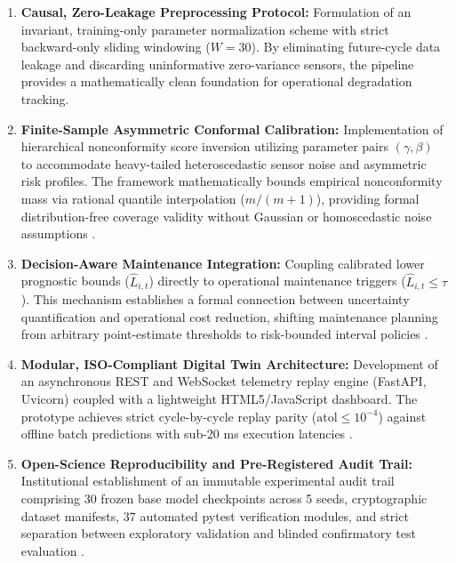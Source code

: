 \documentclass[12pt,a4paper]{article}
\begin{document}
\begin{enumerate}[label=\textbf{(\alph*)},leftmargin=1.5em]
    \item \textbf{Causal, Zero-Leakage Preprocessing Protocol:} Formulation of an invariant, training-only parameter normalization scheme with strict backward-only sliding windowing ($W=30$). By eliminating future-cycle data leakage and discarding uninformative zero-variance sensors, the pipeline provides a mathematically clean foundation for operational degradation tracking.
    \item \textbf{Finite-Sample Asymmetric Conformal Calibration:} Implementation of hierarchical nonconformity score inversion utilizing parameter pairs $(\gamma, \beta)$ to accommodate heavy-tailed heteroscedastic sensor noise and asymmetric risk profiles. The framework mathematically bounds empirical nonconformity mass via rational quantile interpolation ($m/(m+1)$), providing formal distribution-free coverage validity without Gaussian or homoscedastic noise assumptions \cite{javanmardi2023conformal, gneiting2007strictly}.
    \item \textbf{Decision-Aware Maintenance Integration:} Coupling calibrated lower prognostic bounds ($\hat{L}_{i,t}$) directly to operational maintenance triggers ($\hat{L}_{i,t} \le \tau$). This mechanism establishes a formal connection between uncertainty quantification and operational cost reduction, shifting maintenance planning from arbitrary point-estimate thresholds to risk-bounded interval policies \cite{cortesgomez2025predictive, lee2023industrial}.
    \item \textbf{Modular, ISO-Compliant Digital Twin Architecture:} Development of an asynchronous REST and WebSocket telemetry replay engine (FastAPI, Uvicorn) coupled with a lightweight HTML5/JavaScript dashboard. The prototype achieves strict cycle-by-cycle replay parity ($\text{atol} \le 10^{-4}$) against offline batch predictions with sub-20 ms execution latencies \cite{chen2022digital, iso23247_1}.
    \item \textbf{Open-Science Reproducibility and Pre-Registered Audit Trail:} Institutional establishment of an immutable experimental audit trail comprising 30 frozen base model checkpoints across 5 seeds, cryptographic dataset manifests, 37 automated pytest verification modules, and strict separation between exploratory validation and blinded confirmatory test evaluation \cite{lakens2017equivalence, robinson2026turbofan}.
\end{enumerate}
\end{document}
